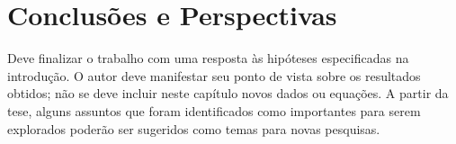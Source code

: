 
\chapter{Conclusões e Perspectivas}\label{cap:conclusoeseperspectivas}

Deve finalizar o trabalho com uma resposta às hipóteses especificadas na introdução. O autor deve manifestar seu ponto de vista sobre os resultados obtidos; não se deve incluir neste capítulo novos dados ou equações. A partir da tese, alguns assuntos que foram identificados como importantes para serem explorados poderão ser sugeridos como temas para novas pesquisas.

